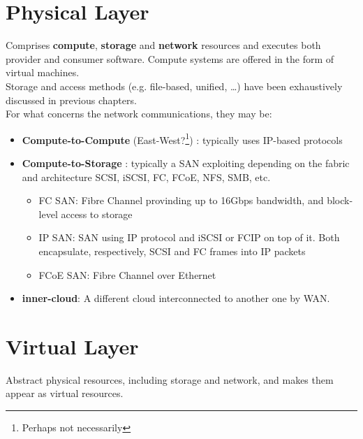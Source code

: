 \section{Physical Layer}
Comprises \textbf{compute}, \textbf{storage} and \textbf{network} resources and executes both provider and consumer software. Compute systems are offered in the form of virtual machines.\\
Storage and access methods (e.g. file-based, unified, \dots) have been exhaustively discussed in previous chapters.\\
For what concerns the network communications, they may be:\ns
\begin{itemize}
   \item \textbf{Compute-to-Compute} (East-West?\footnote{Perhaps not necessarily}) : typically uses IP-based protocols
   \item \textbf{Compute-to-Storage} : typically a SAN exploiting depending on the fabric and architecture SCSI, iSCSI, FC, FCoE, NFS, SMB, etc.\\
   \begin{itemize}
      \item FC SAN: Fibre Channel provinding up to 16Gbps bandwidth, and block-level access to storage
      \item IP SAN: SAN using IP protocol and iSCSI or FCIP on top of it. Both encapsulate, respectively, SCSI and FC frames into IP packets
      \item FCoE SAN: Fibre Channel over Ethernet
   \end{itemize}
   \item \textbf{inner-cloud}: A different cloud interconnected to another one by WAN.
\end{itemize}

\section{Virtual Layer}
Abstract physical resources, including storage and network, and makes them appear as virtual resources.
\nl

